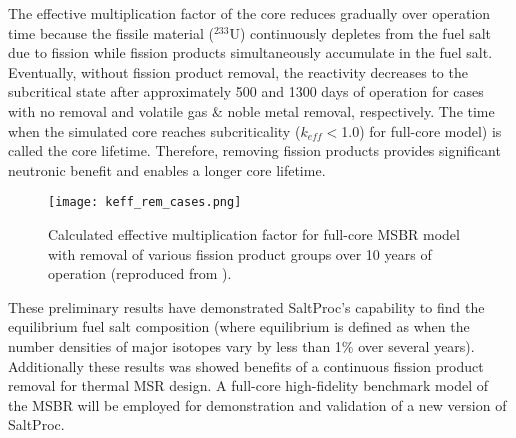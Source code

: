 The effective multiplication factor of the core reduces gradually over 
operation time because the fissile material ($^{233}$U) continuously depletes 
from the fuel salt due to fission while fission products simultaneously
accumulate in the fuel salt. Eventually, without fission product removal, 
the reactivity decreases to the subcritical state after approximately 500 and 
1300 days of operation for cases with no removal and volatile gas \& noble 
metal removal, respectively. The time when the simulated core reaches 
subcriticality ($k_{eff}<$1.0) for full-core model) is called the core 
lifetime. 
Therefore, removing fission products provides significant neutronic benefit 
and enables a longer core lifetime.
\begin{figure}[t] %
	\centering
	\texttt{[image: keff\_rem\_cases.png]} 
	\caption{Calculated effective multiplication factor for full-core 
	\gls{MSBR} model with removal of various fission product groups over 10 
	years of operation (reproduced from \cite{rykhlevskii_modeling_2019}).}
	\label{fig:fp_removal}
\end{figure}

These preliminary results have demonstrated SaltProc's capability to find 
the equilibrium fuel salt composition (where equilibrium is defined as when 
the number densities of major isotopes vary by less than 1\% over several 
years). Additionally these results was showed benefits of a continuous fission 
product removal for thermal \gls{MSR} design. A full-core high-fidelity 
benchmark model of the \gls{MSBR} will be employed for demonstration and 
validation of a new version of SaltProc.
